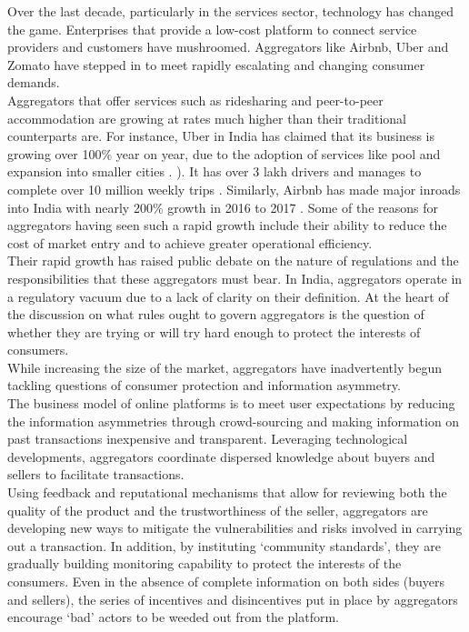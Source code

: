 \documentclass[a4paper, 12pt]{article}
\begin{document}
                   Over the last decade, particularly in the services sector, technology has changed the game. Enterprises that provide a low-cost platform to connect service providers and customers have mushroomed. Aggregators like Airbnb, Uber and Zomato have stepped in to meet rapidly escalating and changing consumer demands. \\
                   
                   Aggregators that offer services such as ridesharing and peer-to-peer accommodation are growing at rates much higher than their traditional counterparts are. For instance, Uber in India has claimed that its business is growing over 100\% year on year, due to the adoption of services like pool and expansion into smaller cities \parencite{PTI2017}. ). It has over 3 lakh drivers and manages to complete over 10 million weekly trips \parencite{PTI2018}. Similarly, Airbnb has made major inroads into India with nearly 200\% growth in 2016 to 2017 \parencite{Laghate 2017}. Some of the reasons for aggregators having seen such a rapid growth include their ability to reduce the cost of market entry and to achieve greater operational efficiency. \\ 
                    
                  Their rapid growth has raised public debate on the nature of regulations and the responsibilities that these aggregators must bear. In India, aggregators operate in a regulatory vacuum due to a lack of clarity on their definition. At the heart of the discussion on what rules ought to govern aggregators is the question of whether they are trying or will try hard enough to protect the interests of consumers.\\

                   While increasing the size of the market, aggregators have inadvertently begun tackling questions of consumer protection and information asymmetry.\\
                     
                     The business model of online platforms is to meet user expectations by reducing the information asymmetries through crowd-sourcing and making information on past transactions inexpensive and transparent. Leveraging technological developments, aggregators coordinate dispersed knowledge about buyers and sellers to facilitate transactions\parencite{thierer2015internet}. \\
                    
                    Using feedback and reputational mechanisms that allow for reviewing both the quality of the product and the trustworthiness of the seller, aggregators are developing new ways to mitigate the vulnerabilities and risks involved in carrying out a transaction. In addition, by instituting ‘community standards’, they are gradually building monitoring capability to protect the interests of the consumers. Even in the absence of complete information on both sides (buyers and sellers), the series of incentives and disincentives put in place by aggregators encourage ‘bad’ actors to be weeded out from the platform. \\
                    
\end{document}
